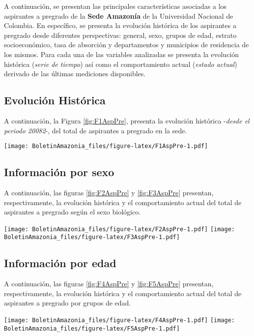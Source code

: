 \documentclass[
]{book}
\begin{document}
A continuación, se presentan las principales características asociadas a los aspirantes a pregrado de la \textbf{Sede Amazonía} de la Universidad Nacional de Colombia. En específico, se presenta la evolución histórica de los aspirantes a pregrado desde diferentes perspectivas: general, sexo, grupos de edad, estrato socioeconómico, tasa de absorción y departamentos y municipios de residencia de los mismos. Para cada una de las variables analizadas se presenta la evolución histórica (\emph{serie de tiempo}) así como el comportamiento actual (\emph{estado actual}) derivado de las últimas mediciones disponibles.

\hypertarget{evoluciuxf3n-histuxf3rica}{%
\subsection{Evolución Histórica}\label{evoluciuxf3n-histuxf3rica}}

A continuación, la Figura \ref{fig:F1AspPre}, presenta la evolución histórica -\emph{desde el periodo 20082}-, del total de aspirantes a pregrado en la sede.

\texttt{[image: BoletinAmazonia\_files/figure-latex/F1AspPre-1.pdf]}

\hypertarget{informaciuxf3n-por-sexo}{%
\subsection{Información por sexo}\label{informaciuxf3n-por-sexo}}

A continuación, las figuras \ref{fig:F2AspPre} y \ref{fig:F3AspPre} presentan, respectivamente, la evolución histórica y el comportamiento actual del total de aspirantes a pregrado según el sexo biológico.

\texttt{[image: BoletinAmazonia\_files/figure-latex/F2AspPre-1.pdf]}
\texttt{[image: BoletinAmazonia\_files/figure-latex/F3AspPre-1.pdf]}

\hypertarget{informaciuxf3n-por-edad}{%
\subsection{Información por edad}\label{informaciuxf3n-por-edad}}

A continuación, las figuras \ref{fig:F4AspPre} y \ref{fig:F5AspPre} presentan, respectivamente, la evolución histórica y el comportamiento actual del total de aspirantes a pregrado por grupos de edad.

\texttt{[image: BoletinAmazonia\_files/figure-latex/F4AspPre-1.pdf]}
\texttt{[image: BoletinAmazonia\_files/figure-latex/F5AspPre-1.pdf]}
\end{document}
